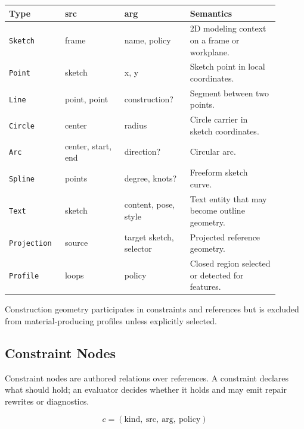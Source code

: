 \documentclass[11pt]{article}
\newcommand{\Type}[1]{\texttt{#1}}
\newcommand{\Field}[1]{\ensuremath{\mathrm{#1}}}
\begin{document}
\begin{center}
\small
\begin{tabular}{@{}p{0.18\linewidth}p{0.20\linewidth}p{0.22\linewidth}p{0.30\linewidth}@{}}
\hline
\textbf{Type} & \textbf{src} & \textbf{arg} & \textbf{Semantics} \\
\hline
\Type{Sketch} & frame & name, policy & 2D modeling context on a frame or workplane. \\
\Type{Point} & sketch & x, y & Sketch point in local coordinates. \\
\Type{Line} & point, point & construction? & Segment between two points. \\
\Type{Circle} & center & radius & Circle carrier in sketch coordinates. \\
\Type{Arc} & center, start, end & direction? & Circular arc. \\
\Type{Spline} & points & degree, knots? & Freeform sketch curve. \\
\Type{Text} & sketch & content, pose, style & Text entity that may become outline geometry. \\
\Type{Projection} & source & target sketch, selector & Projected reference geometry. \\
\Type{Profile} & loops & policy & Closed region selected or detected for features. \\
\hline
\end{tabular}
\end{center}

Construction geometry participates in constraints and references but is excluded from material-producing profiles unless explicitly selected.

\subsection{Constraint Nodes}

Constraint nodes are authored relations over references. A constraint declares what should hold; an evaluator decides whether it holds and may emit repair rewrites or diagnostics.

\[
c = (\Field{kind},\ \Field{src},\ \Field{arg},\ \Field{policy})
\]
\end{document}
